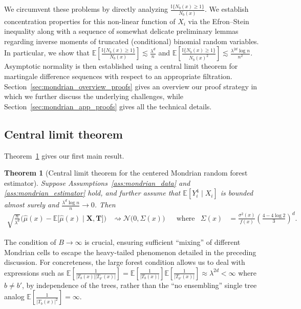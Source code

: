 \documentclass[11pt,lof]{puthesis}
\newcommand{\E}{\ensuremath{\mathbb{E}}}
\newcommand{\I}{\ensuremath{\mathbb{I}}}
\newcommand{\bX}{\ensuremath{\mathbf{X}}}
\newcommand{\bT}{\ensuremath{\mathbf{T}}}
\newcommand{\cN}{\ensuremath{\mathcal{N}}}
\theoremstyle{break}
\newtheorem{theorem}{Theorem}[section]
\theoremstyle{proof}
\begin{document}
We circumvent these problems by directly analyzing
$\frac{\I\{N_b(x) \geq 1\}}{N_b(x)}$. We establish concentration properties for
this non-linear function of $X_i$ via the Efron--Stein inequality
\citep[Section 3.1]{boucheron2013concentration} along with a sequence of
somewhat delicate preliminary lemmas regarding inverse moments of truncated
(conditional) binomial random variables. In particular, we show that
$\E \left[ \frac{\I \{N_b(x) \geq 1\}}{N_b(x)} \right]
\lesssim \frac{\lambda^d}{n}$ and
$\E \left[ \frac{\I \{N_b(x) \geq 1\}}{N_b(x)^2} \right]
\lesssim \frac{\lambda^{2d} \log n}{n^2}$.
Asymptotic normality is then established using a central limit theorem for
martingale difference sequences \citep[Theorem~3.2]{hall1980martingale} with
respect to an appropriate filtration.
Section~\ref{sec:mondrian_overview_proofs} gives
an overview our proof strategy in which we further discuss the underlying
challenges, while Section~\ref{sec:mondrian_app_proofs} gives all the technical
details.

\subsection{Central limit theorem}
\label{sec:mondrian_clt}

Theorem~\ref{thm:mondrian_clt} gives our first main result.

\begin{theorem}[Central limit theorem for the centered
  Mondrian random forest estimator]%
  \label{thm:mondrian_clt}
  Suppose Assumptions~\ref{ass:mondrian_data} and \ref{ass:mondrian_estimator}
  hold, and further assume that
  $\E[Y_i^4 \mid X_i ]$ is bounded almost surely
  and $\frac{\lambda^d \log n}{n} \to 0$. Then
  \begin{align*}
    \sqrt{\frac{n}{\lambda^d}}
    \Big( \hat \mu(x) - \E \big[ \hat \mu(x) \mid \bX, \bT \big] \Big)
    &\rightsquigarrow \cN\big(0, \Sigma(x)\big)
    & &\text{where}
    &\Sigma(x) &=
    \frac{\sigma^2(x)}{f(x)} \left( \frac{4 - 4 \log 2}{3 } \right)^d.
  \end{align*}
\end{theorem}

The condition of $B \to \infty$ is crucial, ensuring sufficient ``mixing'' of
different Mondrian cells to escape the heavy-tailed phenomenon detailed in the
preceding discussion. For concreteness, the large forest condition allows us to
deal with expressions such as
$\E \left[ \frac{1}{|T_b(x)| |T_{b'}(x)|} \right]
= \E \left[ \frac{1}{|T_b(x)|} \right] \E \left[ \frac{1}{|T_{b'}(x)|} \right]
\approx \lambda^{2d} < \infty$
where $b \neq b'$, by independence of the trees, rather than the ``no
ensembling'' single tree analog
$\E \left[ \frac{1}{|T_b(x)|^2} \right] = \infty$.
\end{document}
